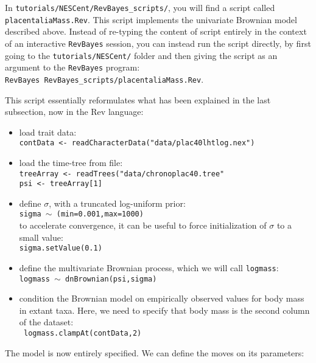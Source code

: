 \documentclass[usletter]{article}
\newcommand{\cmd}[1]{\texttt{#1}}
\begin{document}
In \cmd{tutorials/NESCent/RevBayes\_scripts/}, you will find a script called \cmd{placentaliaMass.Rev}.
This script implements the univariate Brownian model described above. Instead of re-typing the content of script entirely in the context of an interactive \cmd{RevBayes} session, you can instead run the script directly, by first going to the \cmd{tutorials/NESCent/} folder and then giving the script as an argument to the \cmd{RevBayes} program:
\\
\cmd{RevBayes RevBayes\_scripts/placentaliaMass.Rev}.

This script essentially reformulates what has been explained in the last subsection, now in the Rev language:
\begin{itemize}
\item
load trait data:
\\
\cmd{contData <- readCharacterData("data/plac40lhtlog.nex")}
\item
load the time-tree from file:
\\
\cmd{treeArray <- readTrees("data/chronoplac40.tree"
\\
psi <- treeArray[1]
}
\item
define $\sigma$, with a truncated log-uniform prior:
\\
\cmd{sigma $\sim$ (min=0.001,max=1000)}
\\
to accelerate convergence, it can be useful to force initialization of $\sigma$ to a small value:
\\
\cmd{sigma.setValue(0.1)}
\item
define the multivariate Brownian process, which we will call \cmd{logmass}:
\\
\cmd{logmass $\sim$ dnBrownian(psi,sigma)}
\item
condition the Brownian model on empirically observed values for body mass in extant taxa.
Here, we need to specify that body mass is the second column of the dataset:
\\
\cmd{
logmass.clampAt(contData,2)
}
\end{itemize}
The model is now entirely specified. We can define the moves on its parameters:
\end{document}
